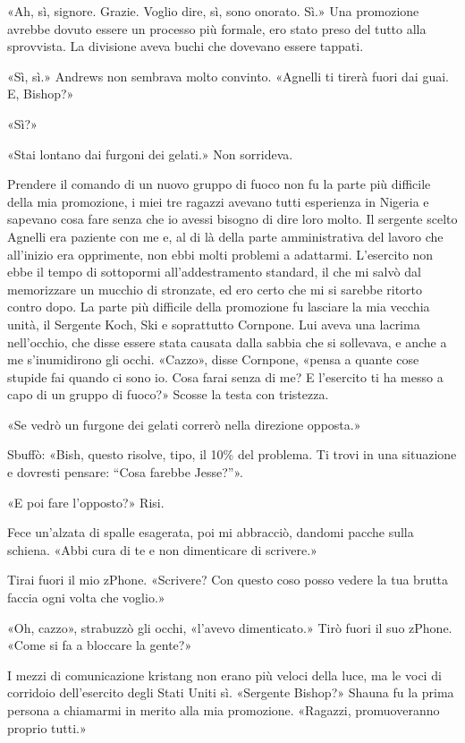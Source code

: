 «Ah, sì, signore. Grazie. Voglio dire, sì, sono onorato. Sì.» Una
promozione avrebbe dovuto essere un processo più formale, ero stato
preso del tutto alla sprovvista. La divisione aveva buchi che dovevano
essere tappati.

«Sì, sì.» Andrews non sembrava molto convinto. «Agnelli ti tirerà fuori
dai guai. E, Bishop?»

«Sì?»

«Stai lontano dai furgoni dei gelati.» Non sorrideva.

\hfill\break

Prendere il comando di un nuovo gruppo di fuoco non fu la parte più
difficile della mia promozione, i miei tre ragazzi avevano tutti
esperienza in Nigeria e sapevano cosa fare senza che io avessi bisogno
di dire loro molto. Il sergente scelto Agnelli era paziente con me e, al
di là della parte amministrativa del lavoro che all'inizio era
opprimente, non ebbi molti problemi a adattarmi. L'esercito non ebbe il
tempo di sottopormi all'addestramento standard, il che mi salvò dal
memorizzare un mucchio di stronzate, ed ero certo che mi si sarebbe
ritorto contro dopo. La parte più difficile della promozione fu lasciare
la mia vecchia unità, il Sergente Koch, Ski e soprattutto Cornpone. Lui
aveva una lacrima nell'occhio, che disse essere stata causata dalla
sabbia che si sollevava, e anche a me s'inumidirono gli occhi. «Cazzo»,
disse Cornpone, «pensa a quante cose stupide fai quando ci sono io. Cosa
farai senza di me? E l'esercito ti ha messo a capo di un gruppo di
fuoco?» Scosse la testa con tristezza.

«Se vedrò un furgone dei gelati correrò nella direzione opposta.»

Sbuffò: «Bish, questo risolve, tipo, il 10\% del problema. Ti trovi in
una situazione e dovresti pensare: ``Cosa farebbe Jesse?''».

«E poi fare l'opposto?» Risi.

Fece un'alzata di spalle esagerata, poi mi abbracciò, dandomi pacche
sulla schiena. «Abbi cura di te e non dimenticare di scrivere.»

Tirai fuori il mio zPhone. «Scrivere? Con questo coso posso vedere la
tua brutta faccia ogni volta che voglio.»

«Oh, cazzo», strabuzzò gli occhi, «l'avevo dimenticato.» Tirò fuori il
suo zPhone. «Come si fa a bloccare la gente?»

\hfill\break

I mezzi di comunicazione kristang non erano più veloci della luce, ma le
voci di corridoio dell'esercito degli Stati Uniti sì. «Sergente Bishop?»
Shauna fu la prima persona a chiamarmi in merito alla mia promozione.
«Ragazzi, promuoveranno proprio tutti.»

